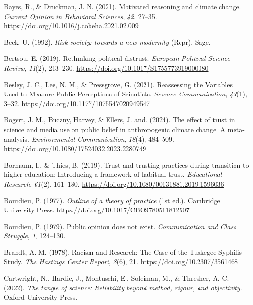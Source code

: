 \documentclass[
  jou,
  floatsintext,
  longtable,
  nolmodern,
  notxfonts,
  notimes,
  colorlinks=true,linkcolor=blue,citecolor=blue,urlcolor=blue]{apa7}
\newlength{\cslhangindent}
\newenvironment{CSLReferences}[2] %
 {\begin{list}{}{%
  \setlength{\itemindent}{0pt}
  \setlength{\leftmargin}{0pt}
  \setlength{\parsep}{0pt}
  \ifodd #1
   \setlength{\leftmargin}{\cslhangindent}
   \setlength{\itemindent}{-1\cslhangindent}
  \fi
  \setlength{\itemsep}{#2\baselineskip}}}
 {\end{list}}
\begin{document}
\begin{CSLReferences}{1}{0}
Bayes, R., \& Druckman, J. N. (2021). Motivated reasoning and climate
change. \emph{Current Opinion in Behavioral Sciences}, \emph{42},
27--35. \url{https://doi.org/10.1016/j.cobeha.2021.02.009}

Beck, U. (1992). \emph{Risk society: towards a new modernity} (Repr).
Sage.

Bertsou, E. (2019). Rethinking political distrust. \emph{European
Political Science Review}, \emph{11}(2), 213--230.
\url{https://doi.org/10.1017/S1755773919000080}

Besley, J. C., Lee, N. M., \& Pressgrove, G. (2021). Reassessing the
Variables Used to Measure Public Perceptions of Scientists.
\emph{Science Communication}, \emph{43}(1), 3--32.
\url{https://doi.org/10.1177/1075547020949547}

Bogert, J. M., Buczny, Harvey, \& Ellers, J. and. (2024). The effect of
trust in science and media use on public belief in anthropogenic climate
change: A meta-analysis. \emph{Environmental Communication},
\emph{18}(4), 484--509.
\url{https://doi.org/10.1080/17524032.2023.2280749}

Bormann, I., \& Thies, B. (2019). Trust and trusting practices during
transition to higher education: Introducing a framework of habitual
trust. \emph{Educational Research}, \emph{61}(2), 161--180.
\url{https://doi.org/10.1080/00131881.2019.1596036}

Bourdieu, P. (1977). \emph{Outline of a theory of practice} (1st ed.).
Cambridge University Press.
\url{https://doi.org/10.1017/CBO9780511812507}

Bourdieu, P. (1979). Public opinion does not exist. \emph{Communication
and Class Struggle}, \emph{1}, 124--130.

Brandt, A. M. (1978). Racism and Research: The Case of the Tuskegee
Syphilis Study. \emph{The Hastings Center Report}, \emph{8}(6), 21.
\url{https://doi.org/10.2307/3561468}

Cartwright, N., Hardie, J., Montuschi, E., Soleiman, M., \& Thresher, A.
C. (2022). \emph{The tangle of science: Reliability beyond method,
rigour, and objectivity}. Oxford University Press.


\end{CSLReferences}
\end{document}
